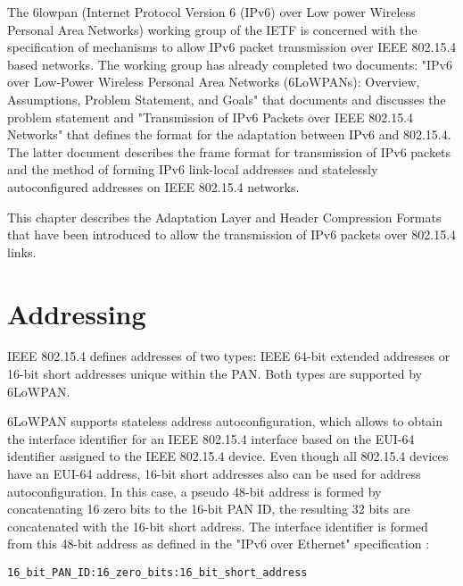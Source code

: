 \documentclass[12pt, titlepage, a4paper]{report}
\begin{document}
The 6lowpan (Internet Protocol Version 6 (IPv6) over Low power Wireless Personal Area Networks) working group of the IETF is concerned with the specification of mechanisms to allow IPv6 packet transmission over IEEE 802.15.4 based networks. The working group has already completed two documents: "IPv6 over Low-Power Wireless Personal Area Networks (6LoWPANs): Overview, Assumptions, Problem Statement, and Goals" \cite{rfc4919} that documents and discusses the problem statement and "Transmission of IPv6 Packets over IEEE 802.15.4 Networks" \cite{rfc4944} that defines the format for the adaptation between IPv6 and 802.15.4. The latter document describes the frame format for transmission of IPv6 packets and the method of forming IPv6 link-local addresses and statelessly autoconfigured addresses on IEEE 802.15.4 networks.


This chapter describes the Adaptation Layer and Header Compression Formats that have been introduced to allow the transmission of IPv6 packets over 802.15.4 links.

\section{Addressing}
IEEE 802.15.4 defines addresses of two types: IEEE 64-bit extended addresses or 16-bit short addresses unique within the PAN. Both types are supported by 6LoWPAN.

6LoWPAN supports stateless address autoconfiguration, which allows to obtain the interface identifier \cite{rfc4291} for an IEEE 802.15.4 interface  based on the EUI-64 identifier \cite{eui64} \cite{rfc2464} assigned to the IEEE 802.15.4 device. Even though all 802.15.4 devices have an EUI-64 address, 16-bit short addresses also can be used for address autoconfiguration.  In this case, a pseudo 48-bit address is formed by concatenating 16 zero bits to the 16-bit PAN ID, the resulting 32 bits are concatenated with the 16-bit short address. The interface identifier is formed from this 48-bit address as defined in the "IPv6 over Ethernet" specification \cite{rfc2464}:
\begin{center}\texttt{16\_bit\_PAN\_ID:16\_zero\_bits:16\_bit\_short\_address}\end{center}
\end{document}
